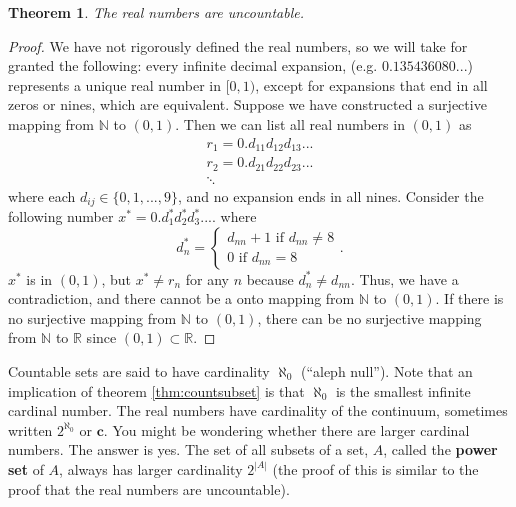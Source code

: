 \documentclass[12pt,reqno]{amsart}
\newtheorem{theorem}{Theorem}[section]
\theoremstyle{definition}
\begin{document}
\begin{theorem}
  The real numbers are uncountable.
\end{theorem}
\begin{proof}
  We have not rigorously defined the real numbers, so we will take for
  granted the following: every infinite decimal expansion,
  (e.g. $0.135436080...$) represents a unique real number in $[0,1)$,
  except for expansions that end in all zeros or nines, which are
  equivalent. Suppose we have constructed a surjective mapping from
  $\mathbb{N}$ to $(0,1)$. Then we can list all real numbers in
  $(0,1)$ as
  \begin{align*}
    r_1 = 0.d_{11} d_{12} d_{13} ... \\
    r_2 = 0.d_{21} d_{22} d_{23} ... \\
    \ddots
  \end{align*}
  where each $d_{ij} \in \{0,1,...,9\}$, and no expansion ends in all
  nines. Consider the following number $x^* = 0.d^*_1 d^*_2 d^*_3 ...$. where 
  \[ 
  d^*_n
  = \begin{cases} d_{nn} + 1 \text{ if } d_{nn} \neq 8 \\
    0 \text{ if } d_{nn} = 8 
  \end{cases} .
  \]  
  $x^*$ is in $(0,1)$, but $x^* \neq r_n$ for any $n$ because $d^*_n
  \neq d_{nn}$. Thus, we have a contradiction, and there cannot be a
  onto mapping from $\mathbb{N}$ to $(0,1)$.  If there is no
  surjective mapping from $\mathbb{N}$ to $(0,1)$, there can be no
  surjective mapping from $\mathbb{N}$ to $\mathbb{R}$ since $(0,1)
  \subset \mathbb{R}$.
\end{proof}
Countable sets are said to have cardinality $\aleph_0$ (``aleph
null''). Note that an implication of theorem \ref{thm:countsubset} is
that $\aleph_0$ is the smallest infinite cardinal number. The real
numbers have cardinality of the continuum, sometimes written
$2^{\aleph_0}$ or $\mathbf{c}$. You might be wondering whether there
are larger cardinal numbers. The answer is yes. The set of all subsets
of a set, $A$, called the \textbf{power set} of $A$, always has larger
cardinality $2^{|A|}$ (the proof of this is similar to the proof that
the real numbers are uncountable). 
\end{document}
